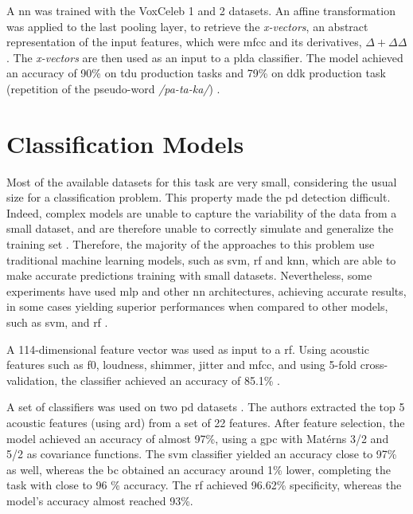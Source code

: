 A \gls{nn} was trained with the VoxCeleb 1 \cite{voxceleb1} and 2 \cite{voxceleb2} datasets. An affine transformation was applied to the last pooling layer, to retrieve the \textit{x-vectors}, an abstract representation of the input features, which were \gls{mfcc} and its derivatives, $\Delta + \Delta \Delta$. The \textit{x-vectors} are then used as an input to a \gls{plda} classifier. The model achieved an accuracy of 90\% on \gls{tdu} production tasks and 79\% on \gls{ddk} production task (repetition of the pseudo-word \textit{/pa-ta-ka/}) \cite{x_vector_parkinson}. 


\section{Classification Models}

Most of the available datasets for this task are very small, considering the usual size for a classification problem. This property made the \gls{pd} detection difficult. Indeed, complex models are unable to capture the variability of the data from a small dataset, and are therefore unable to correctly simulate and generalize the training set \cite{underfitting_small_datasets}. Therefore, the majority of the approaches to this problem use traditional machine learning models, such as \gls{svm}, \gls{rf} and \gls{knn}, which are able to make accurate predictions training with small datasets. Nevertheless, some experiments have used \gls{mlp} and other \gls{nn} architectures, achieving accurate results, in some cases yielding superior performances when compared to other models, such as \gls{svm}, and \gls{rf} \cite{deep_mlp_parkinson}.

A 114-dimensional feature vector was used as input to a \gls{rf}. Using acoustic features such as \gls{f0}, loudness, shimmer, jitter and \gls{mfcc}, and using 5-fold cross-validation, the classifier achieved an accuracy of 85.1\% \cite{parkinson_acoustic_pompilli}. 

A set of classifiers was used on two \gls{pd} datasets \cite{parkinson_acoustic_despotovic}. The authors extracted the top 5 acoustic features (using \gls{ard}) from a set of 22 features. After feature selection, the model achieved an accuracy of almost 97\%, using a \gls{gpc} with Matérns 3/2 and 5/2 as covariance functions. The \gls{svm} classifier yielded an accuracy close to 97\% as well, whereas the \gls{bc} obtained an accuracy around 1\% lower, completing the task with close to 96 \% accuracy. The \gls{rf} achieved 96.62\% specificity, whereas the model's accuracy almost reached 93\%.


